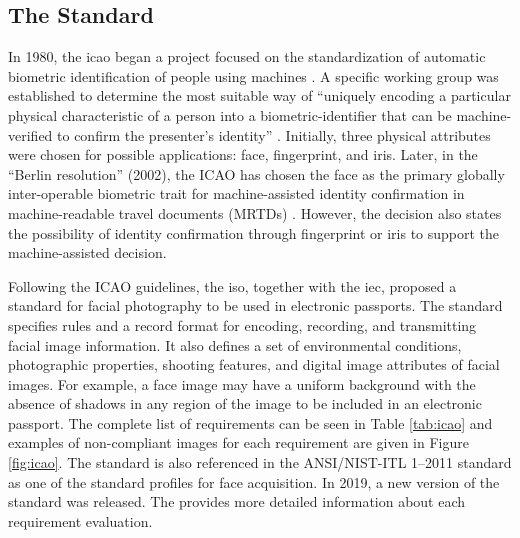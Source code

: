 \subsection{The \icao Standard}

In 1980, the \acf{icao} began a project focused on the standardization of automatic biometric identification of people using machines \citep{icao2003report}. A specific working group was established to determine the most suitable way of ``uniquely encoding a particular physical characteristic of a person into a biometric-identifier that can be machine-verified to confirm the presenter's identity'' \citep{icao2003report}. Initially, three physical attributes were chosen for possible applications: face, fingerprint, and iris. Later, in the ``Berlin resolution'' (2002), the ICAO has chosen the face as the primary globally inter-operable biometric trait for machine-assisted identity confirmation in machine-readable travel documents (MRTDs) \citep{ferrara2012face}. However, the decision also states the possibility of identity confirmation through fingerprint or iris to support the machine-assisted decision.

Following the ICAO guidelines, the \acf{iso}, together with the \acf{iec}, proposed a standard for facial photography to be used in electronic passports. The \icao \citep{iso-iec} standard specifies rules and a record format for encoding, recording, and transmitting facial image information. It also defines a set of environmental conditions, photographic properties, shooting features, and digital image attributes of facial images. For example, a face image may have a uniform background with the absence of shadows in any region of the image to be included in an electronic passport. The complete list of requirements can be seen in Table \ref{tab:icao} and examples of non-compliant images for each requirement are given in Figure \ref{fig:icao}. The \icao standard is also referenced in the ANSI/NIST-ITL 1–2011 standard \citep{nist2011} as one of the standard profiles for face acquisition. In 2019, a new version of the \icao standard was released. The \icaonew provides more detailed information about each requirement evaluation.



